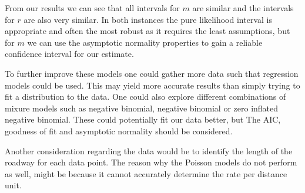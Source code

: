 \documentclass[11pt,preprint, authoryear]{elsarticle}
\numberwithin{equation}{section}
\numberwithin{figure}{section}
\numberwithin{table}{section}
\begin{document}
From our results we can see that all intervals for \(m\) are similar and
the intervals for \(r\) are also very similar. In both instances the
pure likelihood interval is appropriate and often the most robust as it
requires the least assumptions, but for \(m\) we can use the asymptotic
normality properties to gain a reliable confidence interval for our
estimate.

To further improve these models one could gather more data such that
regression models could be used. This may yield more accurate results
than simply trying to fit a distribution to the data. One could also
explore different combinations of mixure models such as negative
binomial, negative binomial or zero inflated negative binomial. These
could potentially fit our data better, but The AIC, goodness of fit and
asymptotic normality should be considered.

Another consideration regarding the data would be to identify the length
of the roadway for each data point. The reason why the Poisson models do
not perform as well, might be because it cannot accurately determine the
rate per distance unit.

\newpage
\nocite{*}

\end{document}
